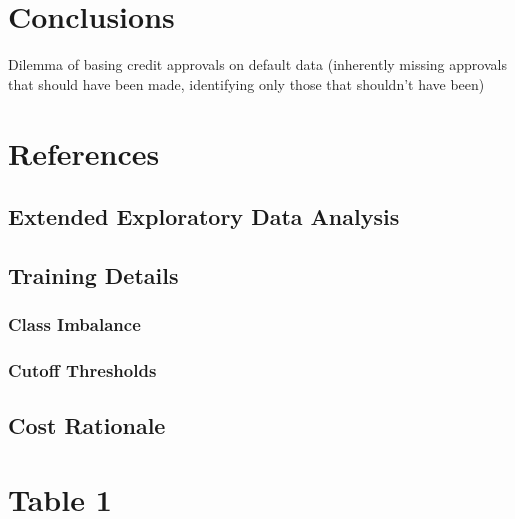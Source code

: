 \documentclass[
]{article}
\begin{document}
\hypertarget{conclusions}{%
\section{Conclusions}\label{conclusions}}

Dilemma of basing credit approvals on default data (inherently missing approvals that should have been made, identifying only those that shouldn't have been)

\newpage

\hypertarget{references}{%
\section{References}\label{references}}

\newpage

\hypertarget{appendix-appendix}{%
\appendix}


\hypertarget{extended-exploratory-data-analysis}{%
\subsection{Extended Exploratory Data Analysis}\label{extended-exploratory-data-analysis}}

\hypertarget{training-details}{%
\subsection{Training Details}\label{training-details}}

\hypertarget{class-imbalance}{%
\subsubsection{Class Imbalance}\label{class-imbalance}}

\hypertarget{cutoff-thresholds}{%
\subsubsection{Cutoff Thresholds}\label{cutoff-thresholds}}

\hypertarget{cost-rationale}{%
\subsection{Cost Rationale}\label{cost-rationale}}

\hypertarget{table-1}{%
\section{Table 1}\label{table-1}}
\end{document}
